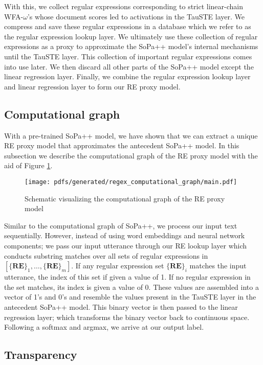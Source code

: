 With this, we collect regular expressions corresponding to strict linear-chain
WFA-$\omega$'s whose document scores led to activations in the TauSTE layer. We
compress and save these regular expressions in a database which we refer to as
the regular expression lookup layer. We ultimately use these collection of
regular expressions as a proxy to approximate the SoPa++ model's internal
mechanisms until the TauSTE layer. This collection of important regular
expressions comes into use later. We then discard all other parts of the SoPa++
model except the linear regression layer. Finally, we combine the regular
expression lookup layer and linear regression layer to form our RE proxy model.

\subsection{Computational graph}

With a pre-trained SoPa++ model, we have shown that we can extract a unique RE
proxy model that approximates the antecedent SoPa++ model. In this subsection we
describe the computational graph of the RE proxy model with the aid of Figure \ref{fig:regex_cg}.

\begin{figure}[t!]
  \centering
  \texttt{[image: pdfs/generated/regex\_computational\_graph/main.pdf]}
  \caption{Schematic visualizing the computational graph of the RE proxy model}
  \label{fig:regex_cg}
\end{figure}

Similar to the computational graph of SoPa++, we process our input text
sequentially. However, instead of using word embeddings and neural network
components; we pass our input utterance through our RE lookup layer which
conducts substring matches over all sets of regular expressions in
$[\{\textbf{RE}\}_1, \ldots, \{\textbf{RE}\}_m]$. If any regular expression set
$\{\textbf{RE}\}_i$ matches the input utterance, the index of this set if given
a value of 1. If no regular expression in the set matches, its index is given a
value of 0. These values are assembled into a vector of 1's and 0's and resemble
the values present in the TauSTE layer in the antecedent SoPa++ model. This
binary vector is then passed to the linear regression layer; which transforms
the binary vector back to continuous space. Following a softmax and argmax, we
arrive at our output label.

\subsection{Transparency}

